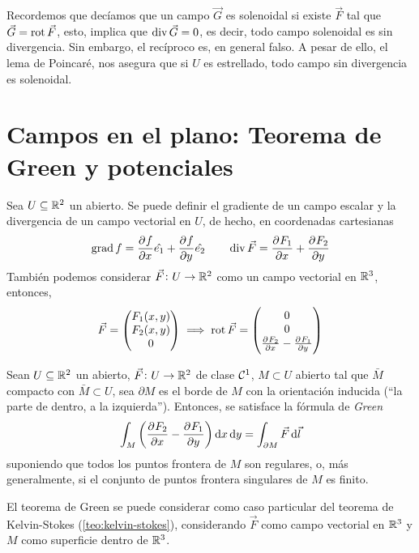 Recordemos que decíamos que un campo $\vec{G}$ es solenoidal si existe $\vec{F}$ tal que $\vec{G} = \operatorname{rot} \vec{F}$, esto, implica
que $\operatorname{div} \vec{G} = 0$, es decir, todo campo solenoidal es sin divergencia. Sin embargo, el recíproco es, en general falso. A pesar de
ello, el lema de Poincar\'e, nos asegura que si $U$ es estrellado, todo campo sin divergencia es solenoidal.

\section{Campos en el plano: Teorema de Green y potenciales}

\begin{defi}
    Sea $U \subseteq \mathbb{R}^2$ un abierto. Se puede definir el gradiente de un campo escalar y la divergencia de un campo
    vectorial en $U$, de hecho, en coordenadas cartesianas
    \[
        \operatorname{grad} f = \frac{\partial^{} f}{\partial x^{}} \hat{e_1} + \frac{\partial^{} f}{\partial y^{}} \hat{e_2} \qquad
        \operatorname{div} \vec{F} = \frac{\partial^{} F_1}{\partial x^{}} + \frac{\partial^{} F_2}{\partial y^{}}
    \]
    También podemos considerar $\vec{F} \colon U \to \mathbb{R}^2$ como un campo vectorial en $\mathbb{R}^3$, entonces,
    \[
        \vec{F} = 
        \begin{pmatrix}
            F_1(x,y) \\ F_2(x,y) \\ 0
        \end{pmatrix} \implies
        \operatorname{rot} \vec{F} =
        \begin{pmatrix}
            0 \\ 0 \\ \frac{\partial^{} F_2}{\partial x^{}} - \frac{\partial^{} F_1}{\partial y^{}}
        \end{pmatrix}
    \]
\end{defi}

\begin{teo}[de Green]
    Sean $U \subseteq \mathbb{R}^2$ un abierto, $\vec{F} \colon U \to \mathbb{R}^2$ de clase $\mathcal{C}^1$, $M \subset U$ abierto tal que
    $\bar{M}$ compacto con $\bar{M} \subset U$, sea $\partial M$ es el borde de $M$ con la orientación inducida (``la parte de dentro,
    a la izquierda''). Entonces, se satisface la fórmula de \emph{Green}
    \[
        \int_M \left( \pdv{F_2}{x} - \pdv{F_1}{y} \right) \dif x \dif y = \int_{\partial M} \vec{F} \dif \vec{l}
    \]
    suponiendo que todos los puntos frontera de $M$ son regulares, o, más generalmente, si el conjunto de puntos frontera singulares
    de $M$ es finito.
\end{teo}

\begin{obs}
    El teorema de Green se puede considerar como caso particular del teorema de Kelvin-Stokes (\ref{teo:kelvin-stokes}), considerando $\vec{F}$
    como campo vectorial en $\mathbb{R}^3$ y $M$ como superficie dentro de $\mathbb{R}^3$.
\end{obs}

